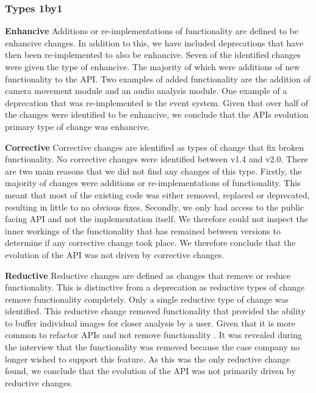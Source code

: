 \documentclass{sig-alternate}
\begin{document}



\subsubsection{Types 1by1}

\smallskip \noindent
\textbf{Enhancive  }
Additions or re-implementations of functionality are defined to be enhancive changes. In addition to this, we have included deprecations that have then been re-implemented to also be enhancive.
Seven of the identified changes were given the type of enhancive. The majority of which were additions of new functionality to the API. Two examples of added functionality are the addition of camera movement module and an audio analysis module. One example of a deprecation that was re-implemented is the event system.
Given that over half of the changes were identified to be enhancive, we conclude that the APIs evolution primary type of change was enhancive. 

\smallskip \noindent
\textbf{Corrective  }
Corrective changes are identified as types of change that fix broken functionality.
No corrective changes were identified between v1.4 and v2.0. There are two main reasons that we did not find any changes of this type. Firstly, the majority of changes were additions or re-implementations of functionality. This meant that most of the existing code was either removed, replaced or deprecated, resulting in little to no obvious fixes. Secondly, we only had access to the public facing API and not the implementation itself. We therefore could not inspect the inner workings of the functionality that has remained between versions to determine if any corrective change took place.
We therefore conclude that the evolution of the API was not driven by corrective changes.

\smallskip \noindent
\textbf{Reductive  }
Reductive changes are defined as changes that remove or reduce functionality. This is distinctive from a deprecation as reductive types of change remove functionality completely.
Only a single reductive type of change was identified. This reductive change removed functionality that provided the ability to buffer individual images for closer analysis by a user. Given that it is more common to refactor APIs and not remove functionality \cite{dig2005role, xing2006refactoring}. It was revealed during the interview that the functionality was removed because the case company no longer wished to support this feature. 
As this was the only reductive change found, we conclude that the evolution of the API was not primarily driven by reductive changes.
\end{document}
